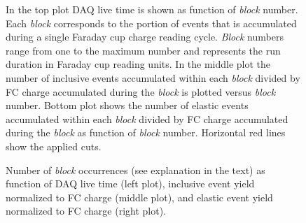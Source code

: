 \begin{figure}[htp]
\begin{center}
\caption{\small  In the top plot DAQ live time is shown as function of {\em block} number. Each {\em block} corresponds to  the portion of events that is accumulated during a single Faraday cup charge reading cycle. {\em Block} numbers range from one to the maximum number and represents the run duration in Faraday cup reading units. In the middle plot the number of inclusive events accumulated within each {\em block} divided by FC charge accumulated during the {\em block} is  plotted versus {\em block} number. Bottom plot shows the number of elastic events accumulated within each {\em block} divided by FC charge accumulated during the {\em block} as function of {\em block} number. Horizontal red lines show the applied cuts.   \label{fig:other_cuts_qcheck2d}}
\end{center}
\end{figure}

\begin{figure}[htp]
\begin{center}
\caption{\small Number of {\em block} occurrences (see explanation in the text) as function of DAQ live time (left plot), inclusive event yield normalized to FC charge  (middle plot), and  elastic event yield normalized to FC charge (right plot). \label{fig:other_cuts_qcheck1d}}
\end{center}
\end{figure}


